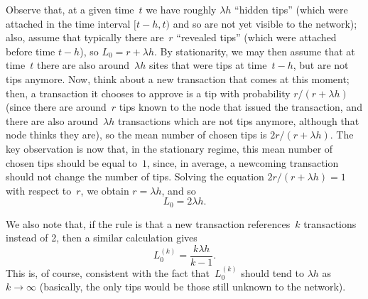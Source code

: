 \documentclass[12pt]{article}
\begin{document}
Observe that,
at a given time~$t$ we have roughly $\lambda h$ ``hidden tips'' 
(which were attached in the time interval $[t-h,t)$ 
 and so are not yet visible to the network);
also, assume that typically there are~$r$ ``revealed tips'' 
 (which were attached before time $t-h$), 
so $L_0 = r+ \lambda h$. 
By stationarity, we may then assume that at time~$t$ there 
are also around~$\lambda h$ sites that were tips at time~$t-h$, 
 but are not tips anymore. 
Now, think about a new transaction that comes at this moment;
then, a transaction it chooses to approve is a tip 
with probability $r/(r+\lambda h)$ (since there are around~$r$
tips known to the node that issued the transaction,
and there are also around~$\lambda h$ transactions which are not 
tips anymore, although that node thinks they are), 
so the mean number of chosen tips is $2r/(r+\lambda h)$. 
The key observation is now that, in the stationary regime,
this mean number of chosen tips should be equal to~$1$,
since, in average, a newcoming transaction should not change
the number of tips.
Solving the equation $2r/(r+\lambda h)=1$ with respect to~$r$, 
we obtain $r=\lambda h$, and so 
\begin{equation}
\label{L0_def} 
L_0 = 2\lambda h.
\end{equation}

We also note that,
if the rule is that a new transaction references~$k$ 
transactions instead of 2, then a similar calculation gives
\begin{equation}
\label{L0k_def} 
 L_0^{(k)} = \frac{k\lambda h}{k-1}.
\end{equation}
This is, of course, consistent with the fact that~$L_0^{(k)}$ 
should tend to $\lambda h$ as $k\to\infty$ (basically, the 
only tips would be those still unknown to the network).
\end{document}
